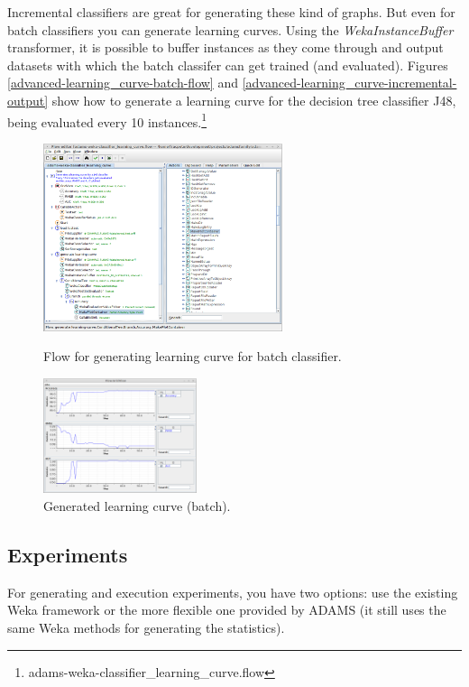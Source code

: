 Incremental classifiers are great for generating these kind of graphs. But
even for batch classifiers you can generate learning curves. Using the 
\textit{WekaInstanceBuffer} transformer, it is possible to buffer instances as
they come through and output datasets with which the batch classifer can get
trained (and evaluated). Figures \ref{advanced-learning_curve-batch-flow} and
\ref{advanced-learning_curve-incremental-output} show how to generate a 
learning curve for the decision tree classifier J48, being evaluated every
10 instances.\footnote{adams-weka-classifier\_learning\_curve.flow}

\begin{figure}[ht]
  \begin{minipage}[t]{0.55\linewidth}
    \centering
    \includegraphics[width=7.0cm]{images/advanced-learning_curve-batch-flow.png}
    \caption{Flow for generating learning curve for batch classifier.}
    \label{advanced-learning_curve-batch-flow}
  \end{minipage}
  \hspace{0.5cm}
  \begin{minipage}[t]{0.45\linewidth}
    \centering
    \includegraphics[width=4.5cm]{images/advanced-learning_curve-batch-output.png}
    \caption{Generated learning curve (batch).}
    \label{advanced-learning_curve-batch-output}
  \end{minipage}
\end{figure}

\subsection{Experiments}
For generating and execution experiments, you have two options: use the
existing Weka framework or the more flexible one provided by ADAMS (it
still uses the same Weka methods for generating the statistics).

